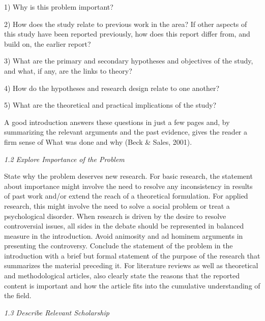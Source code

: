 \documentclass[twoside,10.5pt]{article}%
\begin{document}
1) Why is this problem important?

2) How does the study relate to previous work in the area? If other aspects of this study have been reported previously, how does this report differ from, and build on, the earlier report?

3) What are the primary and secondary hypotheses and objectives of the study, and what, if any, are the links to theory?

4) How do the hypotheses and research design relate to one another?

5) What are the theoretical and practical implications of the study?

A good introduction answers these questions in just a few pages and, by summarizing the relevant arguments and the past evidence, gives the reader a firm sense of What was done and why (Beck \& Sales, 2001).

\emph{1.2 Explore Importance of the Problem}

State why the problem deserves new research. For basic research, the statement about importance might involve the need to resolve any inconsistency in results of past work and/or extend the reach of a theoretical formulation. For applied research, this might involve the need to solve a social problem or treat a psychological disorder. When research is driven by the desire to resolve controversial issues, all sides in the debate should be represented in balanced measure in the introduction. Avoid animosity and ad hominem arguments in presenting the controversy. Conclude the statement of the problem in the introduction with a brief but formal statement of the purpose of the research that summarizes the material preceding it. For literature reviews as well as theoretical and methodological articles, also clearly state the reasons that the reported content is important and how the article fits into the cumulative understanding of the field.

\emph{1.3 Describe Relevant Scholarship}
\end{document}
